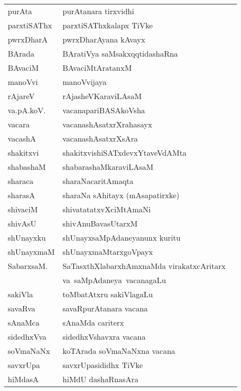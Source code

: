 {\begin{longtable}{l>{\raggedright}p{7cm}l}
purAta & purAtanara tirxvidhi & \\
parxtiSAThx & parxtiSAThxkalapx TiVke &\\
pwrxDharA & pwrxDharAyana kAvayx & \\
BArada & BAratiVya saMsakxqqtidashaRna & \\
BAvaciM & BAvaciMtAratanxM & \\
manoVvi & manoVvijaya & \\
rAjareV & rAjasheVKaraviLAsaM & \\
va.pA.koV. & vacanapariBASAkoVsha & \\
vacara & vacanashAsatxrXrahasayx & \\
vacashA & vacanashAsatxrXsAra & \\
shakitxvi & shakitxvishiSATxdevxYtaveVdAMta & \\
shabashaM & shabarashaMkaraviLAsaM & \\
sharaca & sharaNacaritAmaqta & \\
sharasA & sharaNa sAhitayx (mAsapatirxke) & \\
shivaciM & shivatatatxvXciMtAmaNi & \\
shivAsU & shivAnuBavasUtarxM & \\
shUnayxku & shUnayxsaMpAdaneyanunx kuritu &\\
shUnayxmaM & shUnayxmaMtarxgoVpayx & \\
SabarxsaM.  & SaTasxthXlabarxhAmxnaMda virakatxcAritarx & \\
            & \hbox{va saMpAdaneya vacanagaLu} &\\
sakiVla & toMbatAtxru sakiVlagaLu & \\
savaRva & savaRpurAtanara vacana & \\
sAnaMca & sAnaMda cariterx & \\
sidedhxVva & sidedhxVshavxra vacana & \\
soVmaNaNx & koTArada soVmaNaNxna vacana & \\
savxrUpa & savxrUpasididhx TiVke & \\
hiMdasA & hiMdU dashaRnasAra & \\
\hline
\end{longtable}}
